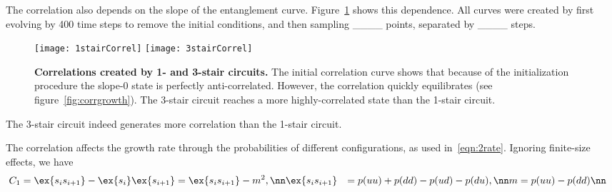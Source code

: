 The correlation also depends on the slope of the entanglement curve. Figure~\ref{fig:steadystate} shows this dependence. All curves were created by first evolving by 400 time steps to remove the initial conditions, and then sampling \_\_\_\_ points, separated by \_\_\_\_ steps.
\begin{figure}
	\centering
	\texttt{[image: 1stairCorrel]}
	\texttt{[image: 3stairCorrel]}
	\caption{\textbf{Correlations created by 1- and 3-stair circuits.} The initial correlation curve shows that because of the initialization procedure the slope-0 state is perfectly anti-correlated. However, the correlation quickly equilibrates (see figure~\ref{fig:corrgrowth}). The 3-stair circuit reaches a more highly-correlated state than the 1-stair circuit.}
	\label{fig:steadystate}
\end{figure}
The 3-stair circuit indeed generates more correlation than the 1-stair circuit. 

The correlation affects the growth rate through the probabilities of different configurations, as used in~\ref{eqn:2rate}. Ignoring finite-size effects, we have
\begin{align}
C_{1} &= \ex{s_is_{i+1}}-\ex{s_i}\ex{s_{i+1}} = \ex{s_is_{i+1}} - m^2,\nn
\ex{s_is_{i+1}} &= p(uu) + p(dd) - p(ud) - p(du),\nn
m &= p(uu) - p(dd)\nn
\end{align}